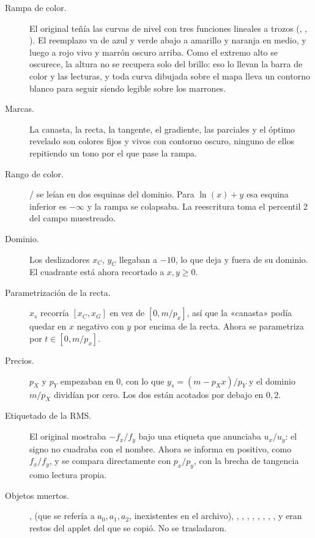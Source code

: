 \documentclass[11pt,a4paper]{appletmanual}
\begin{document}
\begin{description}
\item[Rampa de color.] El original teñía las curvas de nivel con tres funciones
  lineales a trozos (, , ). El
  reemplazo va de azul y verde abajo a amarillo y naranja en medio, y luego a
  rojo vivo y marrón oscuro arriba. Como el extremo alto se oscurece, la altura
  no se recupera solo del brillo: eso lo llevan la barra de color y las
  lecturas, y toda curva dibujada sobre el mapa lleva un contorno blanco para
  seguir siendo legible sobre los marrones.
\item[Marcas.] La canasta, la recta, la tangente, el gradiente, las parciales y
  el óptimo revelado son colores fijos y vivos con contorno oscuro, ninguno de
  ellos repitiendo un tono por el que pase la rampa.
\item[Rango de color.] / se leían en dos esquinas del
  dominio. Para $\ln(x) + y$ esa esquina inferior es $-\infty$ y la rampa se
  colapsaba. La reescritura toma el percentil 2 del campo muestreado.
\item[Dominio.] Los deslizadores $x_C$, $y_C$ llegaban a $-10$, lo que deja
   y  fuera de su dominio. El cuadrante está ahora
  recortado a $x, y \ge 0$.
\item[Parametrización de la recta.] $x_s$ recorría $[x_C, x_G]$ en vez de
  $[0, m/p_x]$, así que la «canasta» podía quedar en $x$ negativo con $y$ por
  encima de la recta. Ahora se parametriza por $t \in [0, m/p_x]$.
\item[Precios.] $p_X$ y $p_Y$ empezaban en 0, con lo que
  $y_s = (m - p_X x)/p_Y$ y el dominio $m/p_X$ dividían por cero. Los dos están
  acotados por debajo en $0{,}2$.
\item[Etiquetado de la RMS.] El original mostraba $-f_x/f_y$ bajo una etiqueta
  que anunciaba $u_x/u_y$: el signo no cuadraba con el nombre. Ahora se informa
  en positivo, como $f_x/f_y$, y se compara directamente con $p_x/p_y$, con la
  brecha de tangencia como lectura propia.
\item[Objetos muertos.] ,  (que se refería a
  $a_0, a_1, a_2$, inexistentes en el archivo), ,
  , ,
  , , ,
  , ,  y  eran restos del applet del que
  se copió. No se trasladaron.
\end{description}
\end{document}
